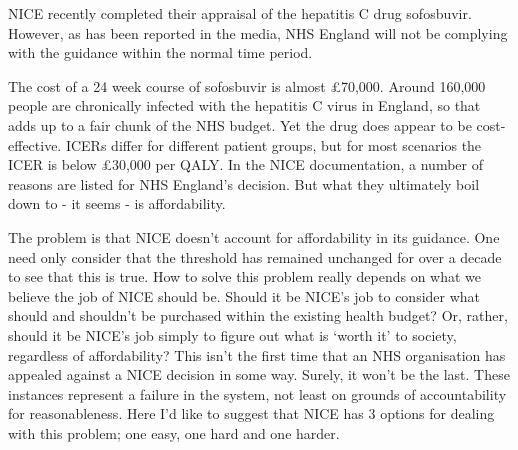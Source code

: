 NICE recently completed their appraisal of the hepatitis C drug sofosbuvir\cite{National_Institute_for_Health_and_Care_Excellence2015-cp}. However, as has been reported in the media, NHS England will not be complying with the guidance within the normal time period\cite{Boseley2015-zg}.

The cost of a 24 week course of sofosbuvir is almost £70,000. Around 160,000 people are chronically infected with the hepatitis C virus in England\cite{Public_Health_England2014-in}, so that adds up to a fair chunk of the NHS budget. Yet the drug does appear to be cost-effective. ICERs differ for different patient groups, but for most scenarios the ICER is below £30,000 per QALY. In the NICE documentation, a number of reasons are listed for NHS England's decision. But what they ultimately boil down to - it seems - is affordability.

The problem is that NICE doesn't account for affordability in its guidance. One need only consider that the threshold has remained unchanged for over a decade to see that this is true. How to solve this problem really depends on what we believe the job of NICE should be. Should it be NICE's job to consider what should and shouldn't be purchased within the existing health budget? Or, rather, should it be NICE's job simply to figure out what is `worth it' to society, regardless of affordability? This isn't the first time that an NHS organisation has appealed against a NICE decision in some way\cite{Wells_2007}. Surely, it won't be the last. These instances represent a failure in the system, not least on grounds of accountability for reasonableness\cite{Daniels_2000}. Here I'd like to suggest that NICE has 3 options for dealing with this problem; one easy, one hard and one harder.